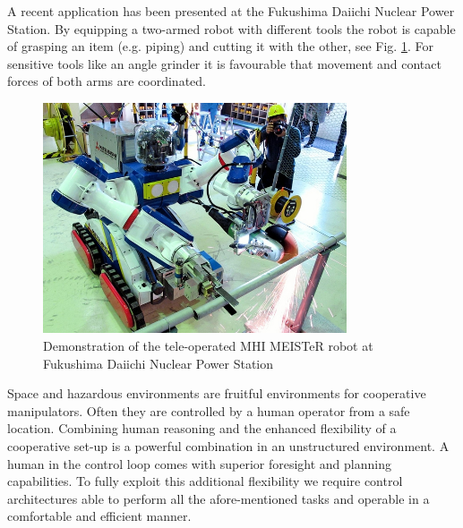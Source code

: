 \documentclass[a4paper,twoside, openright,12pt]{report}
\begin{document}
A recent application has been presented at the Fukushima Daiichi Nuclear Power Station. By equipping a two-armed robot with different tools the robot is capable of grasping an item (e.g. piping) and cutting it with the other, see Fig. \ref{FIG:MEISTeR}. For sensitive tools like an angle grinder it is favourable that movement and contact forces of both arms are coordinated.\\
\begin{figure}
	\centering
	\includegraphics[width=0.8\textwidth]{mhi-meister.jpg}
	\caption[Demonstration of MHI MEISTeR at Fukushima Daiichi NPS]{Demonstration of the tele-operated MHI MEISTeR robot at Fukushima Daiichi Nuclear Power Station \cite{MHI-MEISTeR}}
	\label{FIG:MEISTeR}
	\vspace{-10pt}
\end{figure}
Space and hazardous environments are fruitful environments for cooperative manipulators. Often they are controlled by a human operator from a safe location. Combining human reasoning and the enhanced flexibility of a cooperative set-up is a powerful combination in an unstructured environment. A human in the control loop comes with superior foresight and planning capabilities. To fully exploit this additional flexibility we require control architectures able to perform all the afore-mentioned tasks and operable in a comfortable and efficient manner.\\\\
\end{document}

